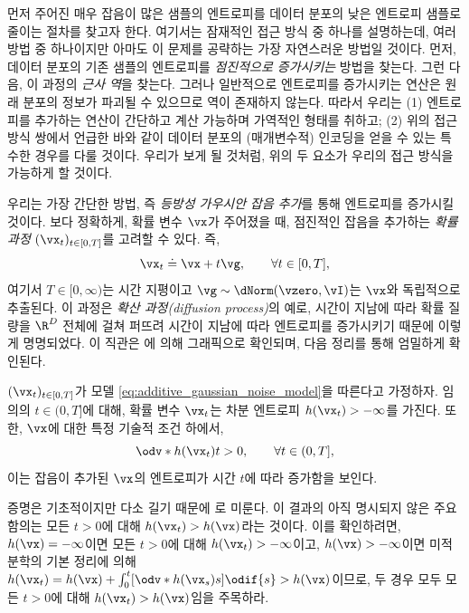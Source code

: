 \documentclass[../../book-main_ko.tex]{subfiles}
\begin{document}
먼저 주어진 매우 잡음이 많은 샘플의 엔트로피를 데이터 분포의 낮은 엔트로피 샘플로 줄이는 절차를 찾고자 한다. 여기서는 잠재적인 접근 방식 중 하나를 설명하는데, 여러 방법 중 하나이지만 아마도 이 문제를 공략하는 가장 자연스러운 방법일 것이다. 먼저, 데이터 분포의 기존 샘플의 엔트로피를 \textit{점진적으로 증가시키는} 방법을 찾는다. 그런 다음, 이 과정의 \textit{근사 역}을 찾는다. 그러나 일반적으로 엔트로피를 증가시키는 연산은 원래 분포의 정보가 파괴될 수 있으므로 역이 존재하지 않는다. 따라서 우리는 (1) 엔트로피를 추가하는 연산이 간단하고 계산 가능하며 가역적인 형태를 취하고; (2) 위의 접근 방식 쌍에서 언급한 바와 같이 데이터 분포의 (매개변수적) 인코딩을 얻을 수 있는 특수한 경우를 다룰 것이다. 우리가 보게 될 것처럼, 위의 두 요소가 우리의 접근 방식을 가능하게 할 것이다.

우리는 가장 간단한 방법, 즉 \textit{등방성 가우시안 잡음 추가}를 통해 엔트로피를 증가시킬 것이다. 보다 정확하게, 확률 변수 \(\vx\)가 주어졌을 때, 점진적인 잡음을 추가하는 \textit{확률 과정} \((\vx_{t})_{t \in [0, T]}\)를 고려할 수 있다. 즉,
\begin{equation}\label{eq:additive_gaussian_noise_model}
	\vx_{t} \doteq \vx + t\vg, \qquad \forall t \in [0, T],
\end{equation}
여기서 \(T \in [0, \infty)\)는 시간 지평이고 \(\vg \sim \dNorm(\vzero, \vI)\)는 \(\vx\)와 독립적으로 추출된다. 이 과정은 \textit{확산 과정(diffusion process)}의 예로, 시간이 지남에 따라 확률 질량을 \(\R^{D}\) 전체에 걸쳐 퍼뜨려 시간이 지남에 따라 엔트로피를 증가시키기 때문에 이렇게 명명되었다. 이 직관은 에 의해 그래픽으로 확인되며, 다음 정리를 통해 엄밀하게 확인된다.
\begin{theorem}
	\((\vx_{t})_{t \in [0, T]}\)가 모델 \eqref{eq:additive_gaussian_noise_model}을 따른다고 가정하자. 임의의 \(t \in (0, T]\)에 대해, 확률 변수 \(\vx_{t}\)는 차분 엔트로피 \(h(\vx_{t}) > -\infty\)를 가진다. 또한, \(\vx\)에 대한 특정 기술적 조건 하에서,
	\begin{equation}
		\odv*{h(\vx_{t})}{t} > 0, \qquad \forall t \in (0, T],
	\end{equation}
	이는 잡음이 추가된 \(\vx\)의 엔트로피가 시간 \(t\)에 따라 증가함을 보인다.
\end{theorem}
증명은 기초적이지만 다소 길기 때문에 로 미룬다. 이 결과의 아직 명시되지 않은 주요 함의는 모든 \(t > 0\)에 대해 \(h(\vx_{t}) > h(\vx)\)라는 것이다. 이를 확인하려면, \(h(\vx) = -\infty\)이면 모든 \(t > 0\)에 대해 \(h(\vx_{t}) > -\infty\)이고, \(h(\vx) > -\infty\)이면 미적분학의 기본 정리에 의해 \(h(\vx_{t}) = h(\vx) + \int_{0}^{t}[\odv*{h(\vx_{s})}{s}]\odif{s} > h(\vx)\)이므로, 두 경우 모두 모든 \(t > 0\)에 대해 \(h(\vx_{t}) > h(\vx)\)임을 주목하라.
\end{document}
